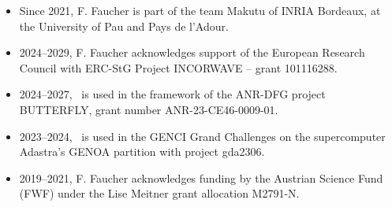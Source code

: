 \begin{itemize}
  \item Since 2021, F. Faucher is part of the team Makutu of INRIA Bordeaux, at the 
                    University of Pau and Pays de l'Adour.
  \item 2024--2029, F. Faucher acknowledges support of the European Research Council 
                    with ERC-StG Project INCORWAVE -- grant 101116288.
  \item 2024--2027, \hawen~is used in the framework of the ANR-DFG project BUTTERFLY,
                     grant number ANR-23-CE46-0009-01.
  \item 2023--2024, \hawen~is used in the GENCI Grand Challenges 
                    on the supercomputer Adastra’s GENOA partition 
                    with project gda2306.
  \item 2019--2021, F. Faucher acknowledges funding by the Austrian Science Fund (FWF) 
        under the Lise Meitner grant allocation M2791-N.
\end{itemize}


